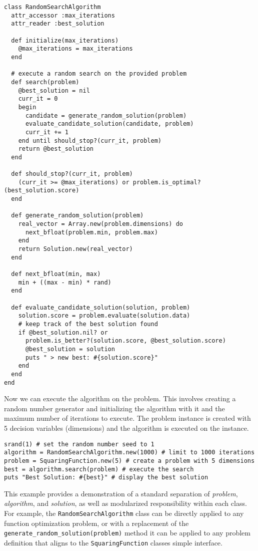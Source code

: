 \begin{lstlisting}
class RandomSearchAlgorithm
  attr_accessor :max_iterations
  attr_reader :best_solution
  
  def initialize(max_iterations)
    @max_iterations = max_iterations
  end
  
  # execute a random search on the provided problem
  def search(problem)    
    @best_solution = nil
    curr_it = 0
    begin
      candidate = generate_random_solution(problem)
      evaluate_candidate_solution(candidate, problem)
      curr_it += 1
    end until should_stop?(curr_it, problem)
    return @best_solution
  end
  
  def should_stop?(curr_it, problem)
    (curr_it >= @max_iterations) or problem.is_optimal?(best_solution.score)
  end
  
  def generate_random_solution(problem)
    real_vector = Array.new(problem.dimensions) do
      next_bfloat(problem.min, problem.max)
    end
    return Solution.new(real_vector)
  end

  def next_bfloat(min, max)
    min + ((max - min) * rand)
  end
  
  def evaluate_candidate_solution(solution, problem)
    solution.score = problem.evaluate(solution.data)
    # keep track of the best solution found
    if @best_solution.nil? or
      problem.is_better?(solution.score, @best_solution.score)
      @best_solution = solution
      puts " > new best: #{solution.score}"               
    end
  end  
end
\end{lstlisting}

Now we can execute the algorithm on the problem. This involves creating a random number generator and initializing the algorithm with it and the maximum number of iterations to execute. The problem instance is created with 5 decision variables (dimensions) and the algorithm is executed on the instance. 

\begin{lstlisting}
srand(1) # set the random number seed to 1
algorithm = RandomSearchAlgorithm.new(1000) # limit to 1000 iterations 
problem = SquaringFunction.new(5) # create a problem with 5 dimensions
best = algorithm.search(problem) # execute the search
puts "Best Solution: #{best}" # display the best solution
\end{lstlisting}

This example provides a demonstration of a standard separation of \emph{problem}, \emph{algorithm}, and \emph{solution}, as well as modularized responsibility within each class. For example, the \texttt{RandomSearchAlgorithm} class can be directly applied to any function optimization problem, or with a replacement of the \texttt{generate\_random\_solution(problem)} method it can be applied to any problem definition that aligns to the \texttt{SquaringFunction} classes simple interface. 
